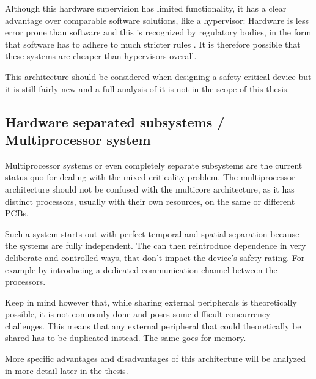Although this hardware supervision has limited functionality, it has a clear advantage over comparable software solutions, like a hypervisor: Hardware is less error prone than software and this is recognized by regulatory bodies, in the form that software has to adhere to much stricter rules \cite{IEC.2010-3}. It is therefore possible that these systems are cheaper than hypervisors overall. 

This architecture should be considered when designing a safety-critical device but it is still fairly new and a full analysis of it is not in the scope of this thesis.
\subsection{Hardware separated subsystems / Multiprocessor system}
Multiprocessor systems or even completely separate subsystems are the current status quo for dealing with the mixed criticality problem. The multiprocessor architecture should not be confused with the multicore architecture, as it has distinct processors, usually with their own resources, on the same or different \gls{PCB}s.

Such a system starts out with perfect temporal and spatial separation because the systems are fully independent. The \mfg{} can then reintroduce dependence in very deliberate and controlled ways, that don't impact the device's safety rating. For example by introducing a dedicated communication channel between the processors. 

Keep in mind however that, while sharing external peripherals is theoretically possible, it is not commonly done and poses some difficult concurrency challenges. This means that any external peripheral that could theoretically be shared has to be duplicated instead. The same goes for memory.

More specific advantages and disadvantages of this architecture will be analyzed in more detail later in the thesis.


